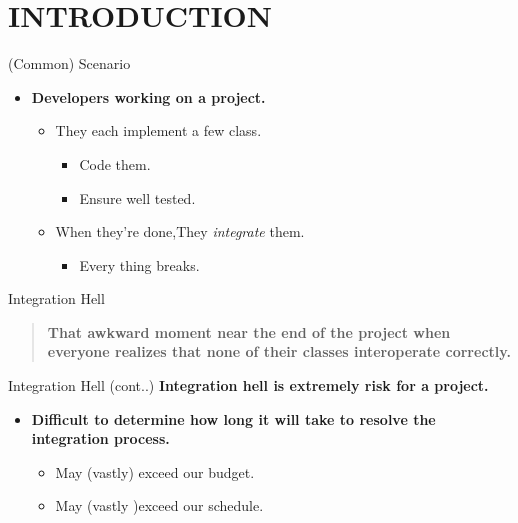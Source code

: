 \documentclass{beamer}
\begin{document}
\section{INTRODUCTION}
\begin{frame}{(Common) Scenario}
\begin{itemize}
\item \textbf {Developers working on a project.}
\begin{itemize}
\vspace{10pt}
\item They each implement a few class.
\begin{itemize}
\vspace{10pt}
\item Code them.
\vspace{10pt}
\item Ensure well tested.
\end{itemize}
\vspace{10pt}
\item When they're done,They \textit{integrate} them.
\begin{itemize}
\vspace{10pt}
\item Every thing breaks.
\end{itemize}
\end{itemize}
\end{itemize}





\end{frame}
\begin{frame}{Integration Hell}
\begin{quote}
\textbf{That awkward moment near the end of the project when everyone realizes that none of their classes interoperate correctly.}
\end{quote} 
\end{frame}
\begin{frame}{Integration Hell (cont..)}
\textbf{Integration hell is extremely risk for a project.}
\begin{itemize}
\vspace{10pt}
\item \textbf{Difficult to determine how long it will take to resolve the integration process.}
\begin{itemize}
\vspace{10pt}
\item May (vastly) exceed our budget.
\vspace{10pt}
\item May (vastly )exceed our schedule.
\end{itemize}
\end{itemize}
\end{frame}
\end{document}
